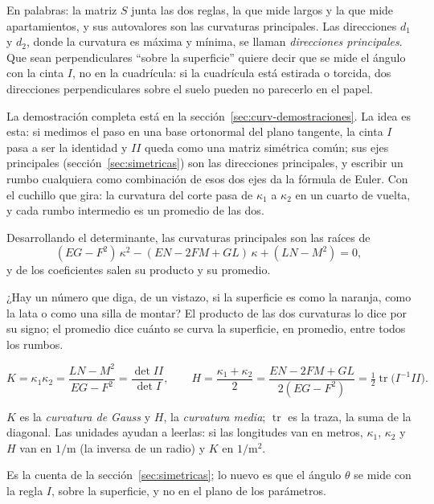 En palabras: la matriz \(S\) junta las dos reglas, la que mide largos y la que mide
apartamientos, y sus autovalores son las curvaturas principales. Las direcciones \(d_1\) y
\(d_2\), donde la curvatura es máxima y mínima, se llaman \emph{direcciones principales}. Que
sean perpendiculares \enquote{sobre la superficie} quiere decir que se mide el ángulo con la
cinta \(I\), no en la cuadrícula: si la cuadrícula está estirada o torcida, dos direcciones
perpendiculares sobre el suelo pueden no parecerlo en el papel.

La demostración completa está en la sección~\ref{sec:curv-demostraciones}. La idea es esta: si
medimos el paso en una base ortonormal del plano tangente, la cinta \(I\) pasa a ser la
identidad y \(II\) queda como una matriz simétrica común; sus ejes principales
(sección~\ref{sec:simetricas}) son las direcciones principales, y escribir un rumbo cualquiera
como combinación de esos dos ejes da la fórmula de Euler. Con el cuchillo que gira: la curvatura
del corte pasa de \(\kappa_1\) a \(\kappa_2\) en un cuarto de vuelta, y cada rumbo intermedio es
un promedio de las dos.

Desarrollando el determinante, las curvaturas principales son las raíces de
\[
  (EG-F^2)\,\kappa^2-(EN-2FM+GL)\,\kappa+(LN-M^2)=0 ,
\]
y de los coeficientes salen su producto y su promedio.

¿Hay un número que diga, de un vistazo, si la superficie es como la naranja, como la lata o
como una silla de montar? El producto de las dos curvaturas lo dice por su signo; el promedio
dice cuánto se curva la superficie, en promedio, entre todos los rumbos.

\begin{definicion}\label{def:gauss-media}
\[
  K=\kappa_1\kappa_2=\frac{LN-M^2}{EG-F^2}=\frac{\det II}{\det I},\qquad
  H=\frac{\kappa_1+\kappa_2}2=\frac{EN-2FM+GL}{2(EG-F^2)}=\tfrac12\operatorname{tr}\bigl(I^{-1}II\bigr).
\]
\end{definicion}

\(K\) es la \emph{curvatura de Gauss} y \(H\), la \emph{curvatura media}; \(\operatorname{tr}\)
es la traza, la suma de la diagonal. Las unidades ayudan a leerlas: si las longitudes van en
metros, \(\kappa_1\), \(\kappa_2\) y \(H\) van en \(1/\mathrm{m}\) (la inversa de un radio) y
\(K\) en \(1/\mathrm{m}^2\).

\begin{idea}
Es la cuenta de la sección~\ref{sec:simetricas}; lo nuevo es que el ángulo \(\theta\) se mide
con la regla \(I\), sobre la superficie, y no en el plano de los parámetros.
\end{idea}

